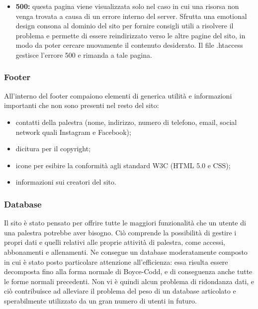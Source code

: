 \documentclass[a4paper]{article}
\begin{document}
\begin{itemize}
		\item \textbf{500:} questa pagina viene visualizzata solo nel caso in cui una risorsa non venga trovata a causa di un errore interno del server. Sfrutta una emotional design consona al dominio del sito per fornire consigli utili a risolvere il problema e permette di essere reindirizzato verso le altre pagine del sito, in modo da poter cercare nuovamente il contenuto desiderato. Il file .htaccess gestisce l'errore 500 e rimanda a tale pagina.
	\end{itemize}
	
	\subsubsection{Footer}
	All'interno del footer compaiono elementi di generica utilità e informazioni importanti che non sono presenti nel resto del sito:
	\begin{itemize}
		\item contatti della palestra (nome, indirizzo, numero di telefono, email, social network quali Instagram e Facebook);
		\item dicitura per il copyright;
		\item icone per esibire la conformità agli standard W3C (HTML 5.0 e CSS);
		\item informazioni sui creatori del sito.
	\end{itemize}
	
	\subsubsection{Database}
	Il sito è stato pensato per offrire tutte le maggiori funzionalità che un utente di una palestra potrebbe aver bisogno. Ciò comprende la possibilità di gestire i propri dati e quelli relativi alle proprie attività di palestra, come accessi, abbonamenti e allenamenti. Ne consegue un database moderatamente composto in cui è stato posto particolare attenzione all'efficienza: essa risulta essere decomposta fino alla forma normale di Boyce-Codd, e di conseguenza anche tutte le forme normali precedenti. Non vi è quindi alcun problema di ridondanza dati, e ciò contribuisce ad alleviare il problema del peso di un database articolato e sperabilmente utilizzato da un gran numero di utenti in futuro.
\end{document}
